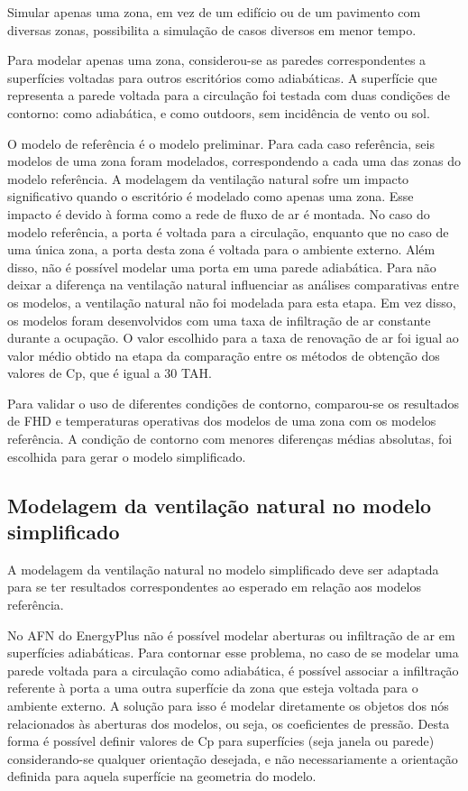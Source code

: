 \documentclass[brazil,hardcopy,openany,a5paper]{ufscthesis}
\begin{document}
		Simular apenas uma zona, em vez de um edifício ou de um pavimento com diversas zonas, possibilita a simulação de casos diversos em menor tempo.
		
		Para modelar apenas uma zona, considerou-se as paredes correspondentes a superfícies voltadas para outros escritórios como adiabáticas. A superfície que representa a parede voltada para a circulação foi testada com duas condições de contorno: como adiabática, e como outdoors, sem incidência de vento ou sol.
		
		O modelo de referência é o modelo preliminar. Para cada caso referência, seis modelos de uma zona foram modelados, correspondendo a cada uma das zonas do modelo referência. A modelagem da ventilação natural sofre um impacto significativo quando o escritório é modelado como apenas uma zona. Esse impacto é devido à forma como a rede de fluxo de ar é montada. No caso do modelo referência, a porta é voltada para a circulação, enquanto que no caso de uma única zona, a porta desta zona é voltada para o ambiente externo. Além disso, não é possível modelar uma porta em uma parede adiabática. Para não deixar a diferença na ventilação natural influenciar as análises comparativas entre os modelos, a ventilação natural não foi modelada para esta etapa. Em vez disso, os modelos foram desenvolvidos com uma taxa de infiltração de ar constante durante a ocupação. O valor escolhido para a taxa de renovação de ar foi igual ao valor médio obtido na etapa da comparação entre os métodos de obtenção dos valores de Cp, que é igual a 30 TAH.
		
		Para validar o uso de diferentes condições de contorno, comparou-se os resultados de FHD e temperaturas operativas dos modelos de uma zona com os modelos referência. A condição de contorno com menores diferenças médias absolutas, foi escolhida para gerar o modelo simplificado.
		
		\subsection{Modelagem da ventilação natural no modelo simplificado}
		
		A modelagem da ventilação natural no modelo simplificado deve ser adaptada para se ter resultados correspondentes ao esperado em relação aos modelos referência.
		
		No AFN do EnergyPlus não é possível modelar aberturas ou infiltração de ar em superfícies adiabáticas. Para contornar esse problema, no caso de se modelar uma parede voltada para a circulação como adiabática, é possível associar a infiltração referente à porta a uma outra superfície da zona que esteja voltada para o ambiente externo. A solução para isso é modelar diretamente os objetos dos nós relacionados às aberturas dos modelos, ou seja, os coeficientes de pressão. Desta forma é possível definir valores de Cp para superfícies (seja janela ou parede) considerando-se qualquer orientação desejada, e não necessariamente a orientação definida para aquela superfície na geometria do modelo.
		
\end{document}
